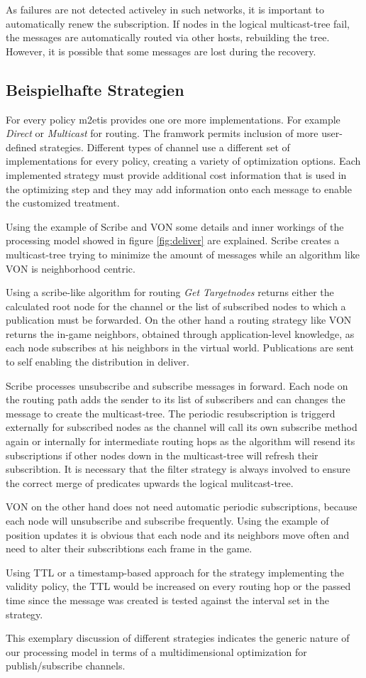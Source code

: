 As failures are not detected activeley in such networks, it is important to automatically renew the subscription. If nodes in the logical multicast-tree fail, the messages are automatically routed via other hosts, rebuilding the tree. However, it is possible that some messages are lost during the recovery.

\subsection{Beispielhafte Strategien}
For every policy \ac{m2etis} provides one ore more implementations. For example \emph{Direct} or \emph{Multicast} for routing. The framwork permits inclusion of more user-defined strategies. Different types of channel use a different set of implementations for every policy, creating a variety of optimization options. Each implemented strategy must provide additional cost information that is used in the optimizing step and they may add information onto each message to enable the customized treatment.

Using the example of Scribe \cite{Castro2002Scribe} and VON \cite{Hu2006VON} some details and inner workings of the processing model showed in figure \ref{fig:deliver} are explained. Scribe creates a multicast-tree trying to minimize the amount of messages while an algorithm like VON is neighborhood centric.

Using a scribe-like algorithm for routing \emph{Get Targetnodes} returns either the calculated root node for the channel or the list of subscribed nodes to which a publication must be forwarded. On the other hand a routing strategy like VON returns the in-game neighbors, obtained through application-level knowledge, as each node subscribes at his neighbors in the virtual world. Publications are sent to self enabling the distribution in deliver.

Scribe processes unsubscribe and subscribe messages in forward. Each node on the routing path adds the sender to its list of subscribers and can changes the message to create the multicast-tree. The periodic resubscription is triggerd externally for subscribed nodes as the channel will call its own subscribe method again or internally for intermediate routing hops as the algorithm will resend its subscriptions if other nodes down in the multicast-tree will refresh their subscribtion. It is necessary that the filter strategy is always involved to ensure the correct merge of predicates upwards the logical mulitcast-tree.

VON on the other hand does not need automatic periodic subscriptions, because each node will unsubscribe and subscribe frequently. Using the example of position updates it is obvious that each node and its neighbors move often and need to alter their subscribtions each frame in the game.

Using TTL or a timestamp-based approach for the strategy implementing the validity policy, the TTL would be increased on every routing hop or the passed time since the message was created is tested against the interval set in the strategy.

This exemplary discussion of different strategies indicates the generic nature of our processing model in terms of a multidimensional optimization for publish/subscribe channels.
